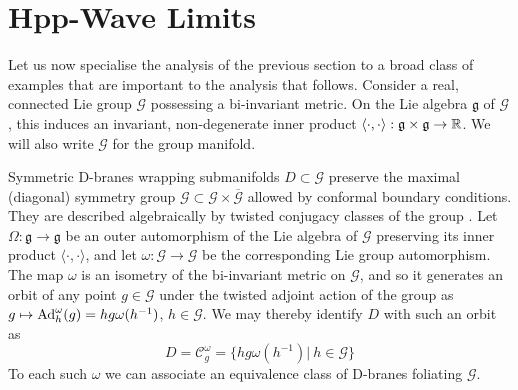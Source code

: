 \section{Hpp-Wave Limits}
\label{PGLNW}
Let us now specialise the analysis of the previous section to a broad class of
examples that are important to the analysis that follows. Consider a real,
connected Lie group $\mathcal{G}$ possessing a bi-invariant metric. On the Lie
algebra $\mathfrak g$ of $\mathcal{G}$, this induces an invariant,
non-degenerate inner product
$\langle\cdot,\cdot\rangle:\mathfrak{g}\times\mathfrak{g}\to{\mathbb R}$. We
will also write $\mathcal{G}$ for the group manifold.

Symmetric D-branes wrapping submanifolds $D\subset \mathcal{G}$ preserve the
maximal (diagonal) symmetry group
$\mathcal{G}\subset\mathcal{G}\times\overline{\mathcal G}$ allowed by conformal
boundary conditions. They are described algebraically by twisted conjugacy
classes of the group \cite{AS1,FFFS1,FS1,Stanciu2}. Let
$\Omega:\mathfrak{g}\to\mathfrak{g}$ be an outer automorphism of the Lie algebra
of $\mathcal{G}$ preserving its inner product $\langle\cdot,\cdot\rangle$, and
let $\omega:\mathcal{G}\to \mathcal{G}$ be the corresponding Lie group
automorphism. The map $\omega$ is an isometry of the bi-invariant metric on
$\mathcal G$, and so it generates an orbit of any point $g\in \mathcal{G}$ under
the twisted adjoint action of the group as $g\mapsto{\rm
  Ad}_h^\omega(g)=hg\omega(h^{-1})$, $h\in \mathcal{G}$. We may thereby identify
$D$ with such an orbit as
\begin{equation}
  \label{Dtwistconj}
  D={\mathcal C}_g^\omega=\{hg\omega(h^{-1})|~h\in \mathcal{G}\}
\end{equation}
To each such $\omega$ we can associate an equivalence class of D-branes
foliating $\mathcal{G}$.


